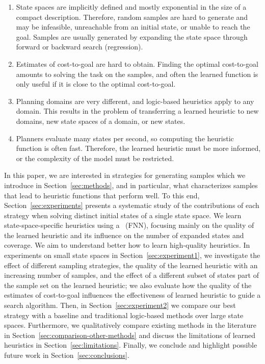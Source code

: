 \begin{enumerate}[label=C\arabic*),left=0pt]
    \itemsep0pt
    \item State spaces are implicitly defined and mostly exponential in the size of a compact description. Therefore, random samples are hard to generate and may be infeasible, unreachable from an initial state, or unable to reach the goal. Samples are usually generated by expanding the state space through forward or backward search (regression).
    \item Estimates of cost-to-goal are hard to obtain. Finding the optimal cost-to-goal amounts to solving the task on the samples, and often the learned function is only useful if it is close to the optimal cost-to-goal.
    \item Planning domains are very different, and logic-based heuristics apply to any domain. This results in the problem of transferring a learned heuristic to new domains, new state spaces of a domain, or new states.
    \item Planners evaluate many states per second, so computing the heuristic function is often fast. Therefore, the learned heuristic must be more informed, or the complexity of the model must be restricted.
\end{enumerate}

In this paper, we are interested in strategies for generating samples which we introduce in Section~\ref{sec:methods}, and in particular, what characterizes samples that lead to heuristic functions that perform well. To this end, Section~\ref{sec:experiments} presents a systematic study of the contributions of each strategy when solving distinct initial states of a single state space. 
We learn state-space-specific heuristics using a ~(FNN), focusing mainly on the quality of the learned heuristic and its influence on the number of expanded states and coverage. We aim to understand better how to learn high-quality heuristics. In experiments on small state spaces in Section~\ref{sec:experiment1}, we investigate the effect of different sampling strategies, the quality of the learned heuristic with an increasing number of samples, and the effect of a different subset of states part of the sample set on the learned heuristic; we also evaluate how the quality of the estimates of cost-to-goal influences the effectiveness of learned heuristic to guide a search algorithm. Then, in Section~\ref{sec:experiment2} we compare our best strategy with a baseline and traditional logic-based methods over large state spaces. Furthermore, we qualitatively compare existing methods in the literature in Section~\ref{sec:comparison-other-methods} and discuss the limitations of learned heuristics in Section~\ref{sec:limitations}. Finally, we conclude and highlight possible future work in Section~\ref{sec:conclusions}.

